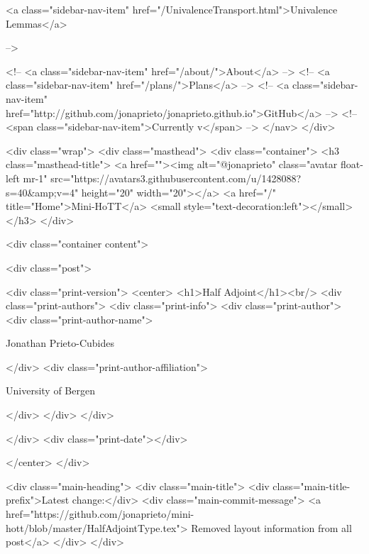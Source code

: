       
    
      
        
          <a class="sidebar-nav-item" href="/UnivalenceTransport.html">Univalence Lemmas</a>
        
      
     -->

    <!-- <a class="sidebar-nav-item" href="/about/">About</a> -->
    <!-- <a class="sidebar-nav-item" href="/plans/">Plans</a> -->
    <!-- <a class="sidebar-nav-item" href="http://github.com/jonaprieto/jonaprieto.github.io">GitHub</a> -->
    <!-- <span class="sidebar-nav-item">Currently v</span> -->
  </nav>
</div>

    <div class="wrap">
      <div class="masthead">
        <div class="container">
          <h3 class="masthead-title">
            <a href=""><img alt="@jonaprieto" class="avatar float-left mr-1" src="https://avatars3.githubusercontent.com/u/1428088?s=40&amp;v=4" height="20" width="20"></a>
            <a href="/" title="Home">Mini-HoTT</a>
            <small style="text-decoration:left"></small>
          </h3>
        </div>
      
      <div class="container content">
        







<div class="post">

  <div class="print-version">
    <center>
      <h1>Half Adjoint</h1><br/>
        <div class="print-authors">
          <div class="print-info">
            <div class="print-author">
              <div class="print-author-name">
                
                  Jonathan Prieto-Cubides
                
              </div>
              <div class="print-author-affiliation">
                
                  University of Bergen
                
                </div>
            </div>
          </div>
          
          
        </div>
        <div class="print-date"></div>
        
        
    </center>
  </div>

  
  <div class="main-heading">
    <div class="main-title">
      <div class="main-title-prefix">Latest change:</div>
      <div class="main-commit-message">
            <a href="https://github.com/jonaprieto/mini-hott/blob/master/HalfAdjointType.tex">
              Removed layout information from all post</a>
      </div>
    </div>

